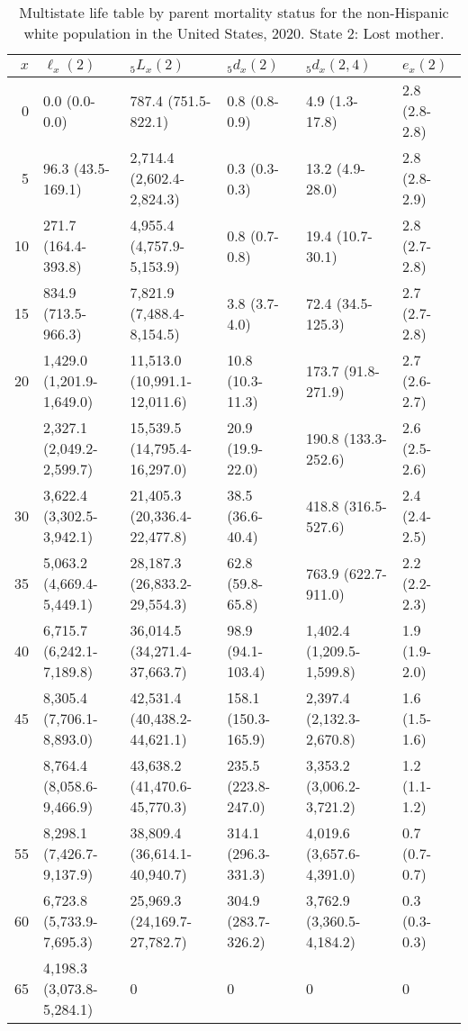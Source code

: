 \begin{table}

\caption{Multistate life table by parent mortality status for the non-Hispanic white population in the United States, 2020. State 2: Lost mother.}
\centering
\begin{tabular}[t]{rlllll}
\toprule
$x$ & $\ell_x(2)$ & ${}_5 L_x(2)$ & ${}_5 d_x(2)$ & ${}_5 d_x(2,4)$ & $e_x(2)$\\
\midrule
0 & 0.0 (0.0-0.0) & 787.4 (751.5-822.1) & 0.8 (0.8-0.9) & 4.9 (1.3-17.8) & 2.8 (2.8-2.8)\\
5 & 96.3 (43.5-169.1) & 2,714.4 (2,602.4-2,824.3) & 0.3 (0.3-0.3) & 13.2 (4.9-28.0) & 2.8 (2.8-2.9)\\
10 & 271.7 (164.4-393.8) & 4,955.4 (4,757.9-5,153.9) & 0.8 (0.7-0.8) & 19.4 (10.7-30.1) & 2.8 (2.7-2.8)\\
15 & 834.9 (713.5-966.3) & 7,821.9 (7,488.4-8,154.5) & 3.8 (3.7-4.0) & 72.4 (34.5-125.3) & 2.7 (2.7-2.8)\\
20 & 1,429.0 (1,201.9-1,649.0) & 11,513.0 (10,991.1-12,011.6) & 10.8 (10.3-11.3) & 173.7 (91.8-271.9) & 2.7 (2.6-2.7)\\
\addlinespace
25 & 2,327.1 (2,049.2-2,599.7) & 15,539.5 (14,795.4-16,297.0) & 20.9 (19.9-22.0) & 190.8 (133.3-252.6) & 2.6 (2.5-2.6)\\
30 & 3,622.4 (3,302.5-3,942.1) & 21,405.3 (20,336.4-22,477.8) & 38.5 (36.6-40.4) & 418.8 (316.5-527.6) & 2.4 (2.4-2.5)\\
35 & 5,063.2 (4,669.4-5,449.1) & 28,187.3 (26,833.2-29,554.3) & 62.8 (59.8-65.8) & 763.9 (622.7-911.0) & 2.2 (2.2-2.3)\\
40 & 6,715.7 (6,242.1-7,189.8) & 36,014.5 (34,271.4-37,663.7) & 98.9 (94.1-103.4) & 1,402.4 (1,209.5-1,599.8) & 1.9 (1.9-2.0)\\
45 & 8,305.4 (7,706.1-8,893.0) & 42,531.4 (40,438.2-44,621.1) & 158.1 (150.3-165.9) & 2,397.4 (2,132.3-2,670.8) & 1.6 (1.5-1.6)\\
\addlinespace
50 & 8,764.4 (8,058.6-9,466.9) & 43,638.2 (41,470.6-45,770.3) & 235.5 (223.8-247.0) & 3,353.2 (3,006.2-3,721.2) & 1.2 (1.1-1.2)\\
55 & 8,298.1 (7,426.7-9,137.9) & 38,809.4 (36,614.1-40,940.7) & 314.1 (296.3-331.3) & 4,019.6 (3,657.6-4,391.0) & 0.7 (0.7-0.7)\\
60 & 6,723.8 (5,733.9-7,695.3) & 25,969.3 (24,169.7-27,782.7) & 304.9 (283.7-326.2) & 3,762.9 (3,360.5-4,184.2) & 0.3 (0.3-0.3)\\
65 & 4,198.3 (3,073.8-5,284.1) & 0 & 0 & 0 & 0\\
\bottomrule
\end{tabular}
\end{table}